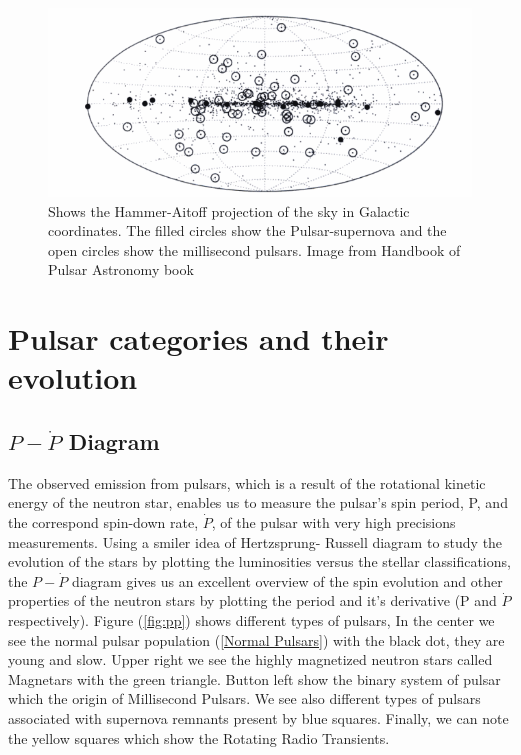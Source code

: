 \begin{figure}[ht!] 
\centering    
\includegraphics[width=1.0\textwidth]{GD.png}
\caption[Galactic Distribution of pulsars]{Shows the Hammer-Aitoff projection of the sky in Galactic coordinates. The filled circles show the Pulsar-supernova and the open circles show the millisecond pulsars. Image from Handbook of Pulsar Astronomy
book }
\label{fig:GD}
\end{figure}

\section{Pulsar categories and their evolution}
\subsection{ \texorpdfstring{$P-\dot{P}$}{} Diagram}
The observed emission from pulsars, which is a result of the rotational kinetic energy of the neutron star, enables us to measure the pulsar's spin period, P, and the correspond spin-down rate, $\dot{P}$, of the pulsar with very high precisions measurements. Using a smiler idea of Hertzsprung- Russell diagram to study the evolution of the stars by plotting the luminosities versus the stellar classifications, the $P-\dot{P}$ diagram gives us an excellent overview of the spin evolution and other properties of the neutron stars by plotting the period and it's derivative (P and $\dot{P}$ respectively). Figure (\ref{fig:pp}) shows different types of pulsars, In the center we see the normal pulsar population (\cref{Normal Pulsars}) with the black dot, they are young and slow. Upper right we see the highly magnetized neutron stars called Magnetars with the green triangle. Button left show the binary system of pulsar which the origin of Millisecond Pulsars. We see also different types of pulsars associated with supernova remnants present by blue squares. Finally, we can note the yellow squares which show the Rotating Radio Transients.

